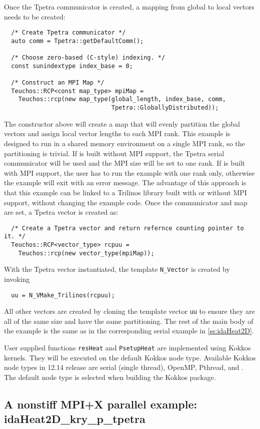 Once the Tpetra communicator is created, a mapping from global to local vectors
needs to be created:
\begin{verbatim}
  /* Create Tpetra communicator */
  auto comm = Tpetra::getDefaultComm();

  /* Choose zero-based (C-style) indexing. */
  const sunindextype index_base = 0;

  /* Construct an MPI Map */
  Teuchos::RCP<const map_type> mpiMap =
    Teuchos::rcp(new map_type(global_length, index_base, comm,
                              Tpetra::GloballyDistributed));
\end{verbatim}
The constructor above will create a map that will evenly partition the global vectors
and assign local vector lengths to each MPI rank. This example is designed to
run in a shared memory environment on a single MPI rank, so the partitioning is trivial.
If {\trilinos} is built without MPI support, the Tpetra serial
communicator will be used and the MPI size will be set to one rank. If {\trilinos} is built
with MPI support, the user has to run the example with one rank only, otherwise the example
will exit with an error message. The advantage of this approach is that
this example can be linked to a Trilinos library built with or without MPI support, without
changing the example code. 
Once the communicator and map are set, a Tpetra vector is created as:
\begin{verbatim}
  /* Create a Tpetra vector and return refernce counting pointer to it. */
  Teuchos::RCP<vector_type> rcpuu =
    Teuchos::rcp(new vector_type(mpiMap));
\end{verbatim}
With the Tpetra vector instantiated, the template \verb|N_Vector| is created by 
invoking
\begin{verbatim}
  uu = N_VMake_Trilinos(rcpuu);
\end{verbatim}
All other vectors are created by cloning the template vector \verb|uu| to
ensure they are all of the same size and have the same partitioning. The
rest of the main body of the example is the same as in the corresponding
serial example in \ref{ss:idaHeat2D}.

User supplied functions \verb|resHeat| and \verb|PsetupHeat| are implemented
using Kokkos kernels. They will be executed on the default Kokkos node type.
Available Kokkos node types in {\trilinos} 12.14 release are serial (single thread),
OpenMP, Pthread, and {\cuda}. The default node type is selected when building
the Kokkos package.


\subsection{A nonstiff MPI+X parallel example: idaHeat2D\_kry\_p\_tpetra}
\label{ss:idaHeat2D_kry_p_tpetra}

